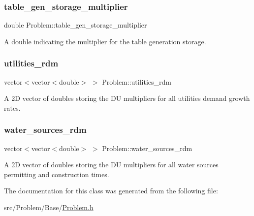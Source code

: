 \subsubsection{\texorpdfstring{table\+\_\+gen\+\_\+storage\+\_\+multiplier}{table\_gen\_storage\_multiplier}}
{\footnotesize\ttfamily double Problem\+::table\+\_\+gen\+\_\+storage\+\_\+multiplier\hspace{0.3cm}{\ttfamily [protected]}}



A double indicating the multiplier for the table generation storage. 

\mbox{\label{classProblem_aa4f6db22580c8d8a941e83556f4f5208}} 
\subsubsection{\texorpdfstring{utilities\+\_\+rdm}{utilities\_rdm}}
{\footnotesize\ttfamily vector$<$vector$<$double$>$ $>$ Problem\+::utilities\+\_\+rdm\hspace{0.3cm}{\ttfamily [protected]}}



A 2D vector of doubles storing the DU multipliers for all utilities\textquotesingle{} demand growth rates. 

\mbox{\label{classProblem_ace43e5306285f0d91a199a4bd5a38922}} 
\subsubsection{\texorpdfstring{water\+\_\+sources\+\_\+rdm}{water\_sources\_rdm}}
{\footnotesize\ttfamily vector$<$vector$<$double$>$ $>$ Problem\+::water\+\_\+sources\+\_\+rdm\hspace{0.3cm}{\ttfamily [protected]}}



A 2D vector of doubles storing the DU multipliers for all water sources\textquotesingle{} permitting and construction times. 



The documentation for this class was generated from the following file\+:\begin{DoxyCompactItemize}
\item 
src/\+Problem/\+Base/\mbox{\hyperlink{Problem_8h}{Problem.\+h}}\end{DoxyCompactItemize}
